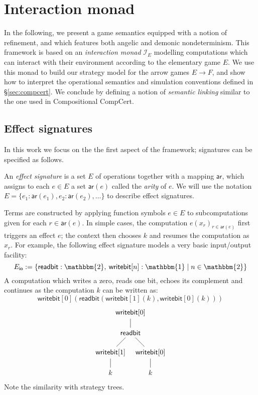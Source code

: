 \documentclass[format=sigplan,authordraft]{acmart}
\newcommand{\kw}[1]{\ensuremath{ \mathsf{#1} }}
\begin{document}


\section{Interaction monad} \label{sec:intmonad} %

In the following,
we present a game semantics equipped with a notion of refinement,
and which features both angelic and demonic nondeterminism.
This framework is based on an \emph{interaction monad} $\mathcal{I}_E$
modelling computations which can interact with their environment
according to the elementary game $E$.
We use this monad to build our strategy model for the
arrow games $E \rightarrow F$,
and show how to interpret the operational semantics
and simulation conventions defined in \S\ref{sec:compcert}.
We conclude by defining a notion of \emph{semantic linking}
similar to the one used in Compositional CompCert.

\subsection{Effect signatures} %

In this work we focus on the the first aspect
of the framework;
signatures can be specified as follows.

\begin{definition}
An \emph{effect signature}
is a set $E$ of operations
together with a mapping $\kw{ar}$,
which assigns to each $e \in E$ a set $\kw{ar}(e)$
called the \emph{arity} of $e$.
We will use the notation
$E = \{ e_1 : \kw{ar}(e_1), e_2 : \kw{ar}(e_2), \ldots \}$
to describe effect signatures.
\end{definition}

Terms are constructed by
applying function symbols $e \in E$
to subcomputations given for each $r \in \kw{ar}(e)$.
In simple cases,
the computation $e(x_r)_{r \in \kw{ar}(e)}$
first triggers an effect $e$;
the context then chooses $k$
and resumes the computation as $x_r$.
For example,
the following effect signature
models a very basic input/output facility:
\[
  E_\kw{io} :=
    \{ \kw{readbit} : \mathbbm{2}, \:
       \kw{writebit}[n] : \mathbbm{1} \mid
       n \in \mathbbm{2} \}
\]
A computation which writes a zero,
reads one bit, echoes its complement
and continues as the computation $k$
can be written as:
\[
  \kw{writebit}[0](
    \kw{readbit}(
      \kw{writebit}[1](k),
      \kw{writebit}[0](k)))
\]
\[
  \begin{tikzpicture}
    \node (W) at (0,0) {$\kw{writebit}[0]$};
    \node (R) at (0,-1) {$\kw{readbit}$};
    \node (W0) at (-1,-2) {$\kw{writebit}[1]$};
    \node (W1) at (+1,-2) {$\kw{writebit}[0]$};
    \node (K0) at (-1,-3) {$k$};
    \node (K1) at (+1,-3) {$k$};
    \path (W) edge (R);
    \path (R) edge (W0);
    \path (R) edge (W1);
    \path (W0) edge (K0);
    \path (W1) edge (K1);
  \end{tikzpicture}
\]
Note the similarity with strategy trees.
\end{document}

